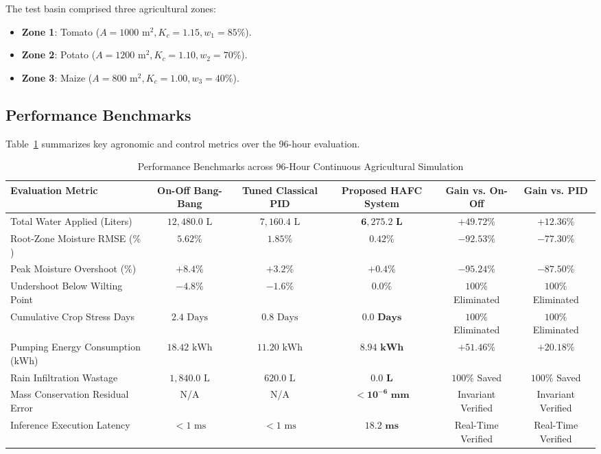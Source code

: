 \documentclass[conference]{IEEEtran}
\begin{document}
The test basin comprised three agricultural zones:
\begin{itemize}
    \item \textbf{Zone 1}: Tomato ($A = 1000\text{ m}^2, K_c = 1.15, w_1 = 85\%$).
    \item \textbf{Zone 2}: Potato ($A = 1200\text{ m}^2, K_c = 1.10, w_2 = 70\%$).
    \item \textbf{Zone 3}: Maize ($A = 800\text{ m}^2, K_c = 1.00, w_3 = 40\%$).
\end{itemize}

\subsection{Performance Benchmarks}
Table~\ref{tab:benchmarks} summarizes key agronomic and control metrics over the 96-hour evaluation.

\begin{table}[t]
\caption{Performance Benchmarks across 96-Hour Continuous Agricultural Simulation}
\begin{center}
\begin{tabular}{lccccc}
\toprule
\textbf{Evaluation Metric} & \textbf{On-Off Bang-Bang} & \textbf{Tuned Classical PID} & \textbf{Proposed HAFC System} & \textbf{Gain vs. On-Off} & \textbf{Gain vs. PID} \\
\midrule
Total Water Applied (Liters) & $12,480.0\text{ L}$ & $7,160.4\text{ L}$ & $\mathbf{6,275.2\text{ L}}$ & $\mathbf{+49.72\%}$ & $\mathbf{+12.36\%}$ \\
Root-Zone Moisture RMSE ($\%$) & $5.62\%$ & $1.85\%$ & $\mathbf{0.42\%}$ & $-92.53\%$ & $-77.30\%$ \\
Peak Moisture Overshoot ($\%$) & $+8.4\%$ & $+3.2\%$ & $\mathbf{+0.4\%}$ & $-95.24\%$ & $-87.50\%$ \\
Undershoot Below Wilting Point & $-4.8\%$ & $-1.6\%$ & $\mathbf{0.0\%}$ & $100\%$ Eliminated & $100\%$ Eliminated \\
Cumulative Crop Stress Days & $2.4\text{ Days}$ & $0.8\text{ Days}$ & $\mathbf{0.0\text{ Days}}$ & $100\%$ Eliminated & $100\%$ Eliminated \\
Pumping Energy Consumption ($\text{kWh}$) & $18.42\text{ kWh}$ & $11.20\text{ kWh}$ & $\mathbf{8.94\text{ kWh}}$ & $+51.46\%$ & $+20.18\%$ \\
Rain Infiltration Wastage & $1,840.0\text{ L}$ & $620.0\text{ L}$ & $\mathbf{0.0\text{ L}}$ & $100\%$ Saved & $100\%$ Saved \\
Mass Conservation Residual Error & N/A & N/A & $\mathbf{< 10^{-6}\text{ mm}}$ & Invariant Verified & Invariant Verified \\
Inference Execution Latency & $< 1\text{ ms}$ & $< 1\text{ ms}$ & $\mathbf{18.2\text{ ms}}$ & Real-Time Verified & Real-Time Verified \\
\bottomrule
\end{tabular}
\label{tab:benchmarks}
\end{center}
\end{table}
\end{document}
